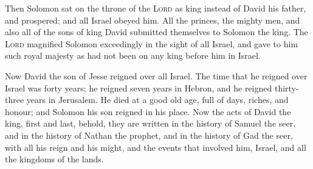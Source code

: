  Then Solomon sat on the throne of the \textsc{Lord} as
king instead of David his father, and prospered; and all Israel obeyed
him.  All the princes, the mighty men, and also all of
the sons of king David submitted themselves to Solomon the king.
 The \textsc{Lord} magnified Solomon exceedingly in the
sight of all Israel, and gave to him such royal majesty as had not been
on any king before him in Israel.

 Now David the son of Jesse reigned over all Israel.
 The time that he reigned over Israel was forty years; he
reigned seven years in Hebron, and he reigned thirty-three years in
Jerusalem.  He died at a good old age, full of days,
riches, and honour; and Solomon his son reigned in his place.
 Now the acts of David the king, first and last, behold,
they are written in the history of Samuel the seer, and in the history
of Nathan the prophet, and in the history of Gad the seer,
 with all his reign and his might, and the events that
involved him, Israel, and all the kingdoms of the lands.
